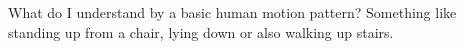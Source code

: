 What do I understand by a basic human motion pattern?
Something like standing up from a chair, lying down or also walking up stairs.
